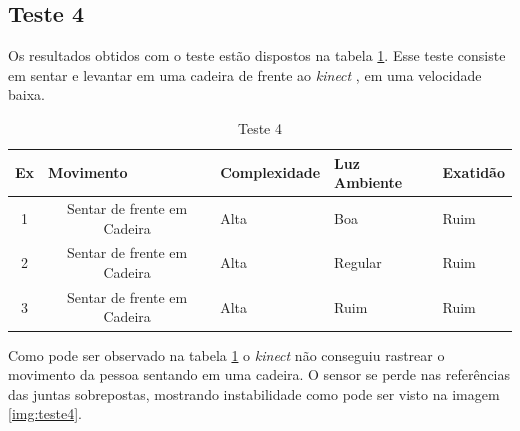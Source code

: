 \subsection{Teste 4}\label{sub:teste4}
Os resultados obtidos com o teste estão dispostos na tabela \ref{tab:teste4}. Esse teste consiste em sentar e levantar em uma cadeira de frente ao \textit{kinect} , em uma velocidade
baixa.


\begin{table}[H]
\centering
\caption{Teste 4}
\label{tab:teste4}
\begin{tabular}{@{}|c|c|l|l|l|@{}}
\toprule
\multicolumn{1}{|l|}{\textbf{Ex}} & \multicolumn{1}{l|}{\textbf{Movimento}} & \textbf{Complexidade} & \textbf{Luz Ambiente} & \textbf{Exatidão} \\ \midrule
1                                 & Sentar de frente em Cadeira                     & Alta                 & Boa                   & Ruim               \\ \midrule
2                                 & Sentar de frente em Cadeira                     & Alta                 & Regular               & Ruim           \\ \midrule
3                                 & Sentar de frente em Cadeira                     & Alta                 & Ruim                  & Ruim              \\ \bottomrule
\end{tabular}
\end{table}

Como pode ser observado na tabela \ref{tab:teste4} o \textit{kinect} não conseguiu rastrear o movimento da pessoa sentando em uma cadeira. O sensor se perde nas referências das juntas
sobrepostas, mostrando instabilidade como pode ser visto na imagem \ref{img:teste4}.

